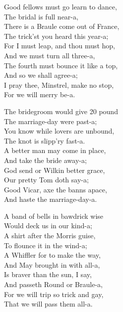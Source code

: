 \begin{dcverse}
\settowidth{\versewidth}{The bridegroom would give 20 pound}
\begin{altverse}
Good fellows must go learn to dance,\\
The bridal is full near-a,\\
There is a Braule come out of France,\\
The trick’st you heard this year-a;\\
For I must leap, and thou must hop,\\
And we must turn all three-a,\\
The fourth must bounce it like a top,\\
And so we shall agree-a;\\
I pray thee, Minstrel, make no stop,\\
For we will merry be-a.
\end{altverse}

\begin{altverse}
The bridegroom would give 20 pound\\
The marriage-day were past-a;\\
You know while lovers are unbound,\\
The knot is slipp’ry fast-a.\\
A better man may come in place,\\
And take the bride away-a;\\
God send or Wilkin better grace,\\
Our pretty Tom doth say-a;\\
Good Vicar, axe the banns apace,\\
And haste the marriage-day-a.
\end{altverse}

\begin{altverse}
A band of bells in bawdrick wise\\
Would deck us in our kind-a;\\
A shirt after the Morris guise,\\
To flounce it in the wind-a;\\
A Whiffler for to make the way,\\
And May brought in with all-a,\\
Is braver than the sun, I say,\\
And passeth Round or Braule-a,\\
For we will trip so trick and gay,\\
That we will pass them all-a.
\end{altverse}


\end{dcverse}
